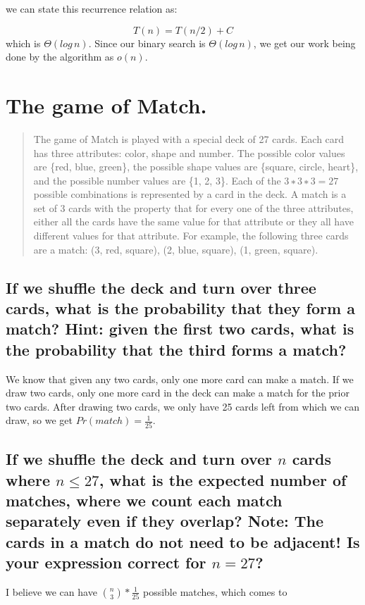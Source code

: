 \documentclass[titlepage]{article}\usepackage[]{graphicx}\usepackage[]{color}
\begin{document}
  we can state this recurrence relation as:

  \[ T(n) = T(n/2) + C \]
  which is $\Theta(log\,n)$. Since our binary search is $\Theta(log\,n)$, we
  get our work being done by the algorithm as $o(n)$. 
  

  \section{ The game of Match. }
  \begin{quote}
  The game of Match is played with a special deck of 27 cards. Each card has
  three attributes: color, shape and number. The possible color values are
  \{red, blue, green\}, the possible shape values are \{square, circle, heart\},
  and the possible number values are \{1, 2, 3\}. Each of the $3 ∗ 3 ∗ 3 = 27$
  possible combinations is represented by a card in the deck. A match is a set
  of 3 cards with the property that for every one of the three attributes,
  either all the cards have the same value for that attribute or they all have
  different values for that attribute. For example, the following three cards
  are a match: (3, red, square), (2, blue, square), (1, green, square).
  \end{quote}

\subsection{ If we shuffle the deck and turn over three cards, what is the
probability that they form a match? Hint: given the first two
cards, what is the probability that the third forms a match?}

We know that given any two cards, only one more card can make a match. If we
draw two cards, only one more card in the deck can make a match for the prior
two cards. After drawing two cards, we only have 25 cards left from which we
can draw, so we get $Pr(match) = \frac{1}{25}$. 

\subsection{ If we shuffle the deck and turn over $n$ cards where $n \leq 27$, what
is the expected number of matches, where we count each match
separately even if they overlap? Note: The cards in a match do
not need to be adjacent! Is your expression correct for $n = 27$?}

I believe we can have ${n \choose 3} * \frac{1}{25}$ possible matches, which
comes to 
\end{document}
